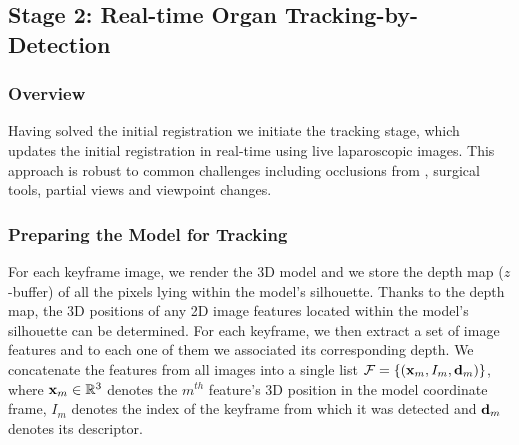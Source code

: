 
\subsection{Stage 2: Real-time Organ Tracking-by-Detection}
\label{sec:updateRegistration}
\subsubsection{Overview}
Having solved the initial registration we initiate the tracking stage, which updates the initial registration in real-time using live laparoscopic images. %
This approach is robust to common challenges including occlusions from \eg, surgical tools, partial views and viewpoint changes.


\subsubsection{Preparing the Model for Tracking}
\label{sec:preparing}
For each keyframe image, we render the 3D model and we store the depth map ($z$-buffer) of all the pixels lying within the model's silhouette. %
Thanks to the depth map, the 3D positions of any 2D image features located within the model's silhouette can be determined.
For each keyframe, we then extract a set of image features and to each one of them we associated its corresponding depth. 
We concatenate the features from all images into a single list $\mathcal{F}=\{(\mathbf{x}_{m},I_{m},\mathbf{d}_{m})\}$, where $\mathbf{x}_{m} \in \mathbb{R}^3$ denotes the $m^{th}$ feature's 3D position in the model coordinate frame, $I_{m}$ denotes the index of the keyframe from which it was detected and $\mathbf{d}_{m}$ denotes its descriptor.

